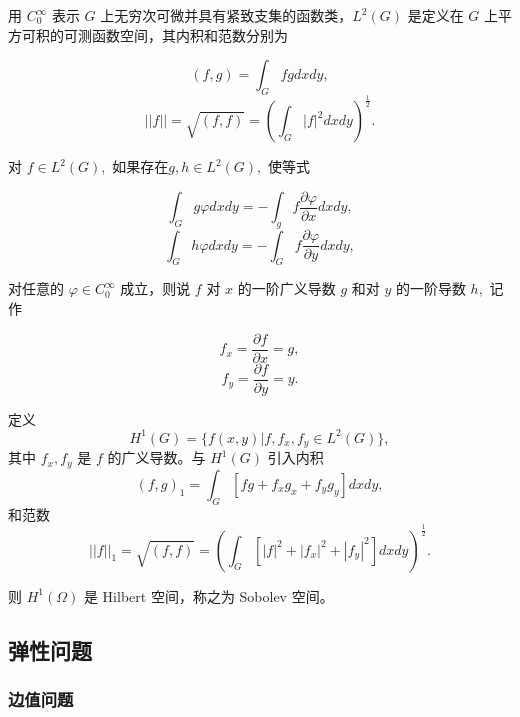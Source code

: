 \documentclass[a4paper,UTF8,titlepage,10pt]{ctexart}
\numberwithin{equation}{subsection}
\begin{document}
用 $C_0^{\infty} $ 表示 $G$ 上无穷次可微并具有紧致支集的函数类，$L^2(G)$ 是定义在 $G$ 上平方可积的可测函数空间，其内积和范数分别为

\begin{equation}
	(f,g) = \int_G fg dxdy,
\end{equation}
\begin{equation}
	||f || = \sqrt{(f,f)} = (\int_G |f|^2 dxdy)^{\frac{1}{2}}.
\end{equation}

对 $f \in L^2(G),$ 如果存在$g,h \in L^2(G),$ 使等式

\begin{equation}
	\int_G g \varphi dxdy = - \int_g f \frac{\partial \varphi}{\partial x} dxdy ,
\end{equation}
\begin{equation}
	\int_G h \varphi dxdy = - \int_G f \frac{\partial \varphi}{\partial y} dxdy ,
\end{equation}

对任意的 $\varphi \in C_0^{\infty}$ 成立，则说 $f$ 对 $x$ 的一阶广义导数 $g$ 和对 $y$ 的一阶导数 $h,$ 记作

\begin{equation}
	f_x = \frac{\partial f}{\partial x} = g ,
\end{equation}
\begin{equation}
	f_y = \frac{\partial f}{\partial y} = y .
\end{equation}

定义 
$$
	H^1(G) = \{f(x,y) | f, f_x, f_y \in L^2(G) \} ,
$$
其中 $f_x, f_y $ 是 $f$ 的广义导数。与 $H^1(G)$ 引入内积
\begin{equation}
	(f,g)_1 = \int_G [fg + f_x g_x + f_y g_y] dxdy ,
\end{equation}
和范数
\begin{equation}
	||f||_1 = \sqrt{(f,f)} = (\int_G [|f|^2 + |f_x|^2 + |f_y|^2] dxdy )^{\frac{1}{2}} .
\end{equation}

则 $H^1(\Omega)$ 是 Hilbert 空间，称之为 Sobolev 空间。

\subsection{弹性问题}

\subsubsection{边值问题}
\end{document}
